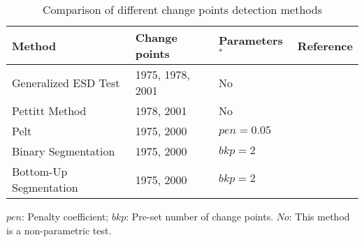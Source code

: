 \begin{table}[h!]
    \centering
    \begin{tabularx}{\textwidth}{llll}
        \toprule
        \textbf{Method} & \textbf{Change points} & \textbf{Parameters$^*$} & \textbf{Reference} \\
        \midrule
        Generalized ESD Test & 1975, 1978, 2001 & No & \cite{matteson2014} \\
        Pettitt Method & 1978, 2001 & No & \cite{pettitt1979} \\
        Pelt & 1975, 2000 & $pen=0.05$ & \cite{killick2012} \\
        Binary Segmentation & 1975, 2000 & $bkp=2$ & \cite{bai1997} \\
        Bottom-Up Segmentation & 1975, 2000 & $bkp=2$ & \cite{keogh2001} \\
        \bottomrule
    \end{tabularx}
    \footnotesize{$pen$: Penalty coefficient; $bkp$: Pre-set number of change points. $No$: This method is a non-parametric test.}
    \caption{Comparison of different change points detection methods}\label{table:breakpoint-detection-methods}
\end{table}

